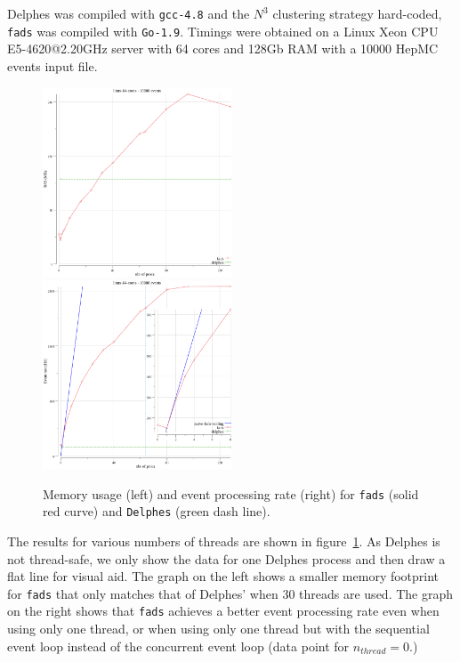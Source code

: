 \documentclass[a4paper]{jpconf}
\begin{document}
Delphes was compiled with \texttt{gcc-4.8} and the $N^3$ clustering strategy hard-coded, \texttt{fads} was compiled with \texttt{Go-1.9}.
Timings were obtained on a Linux Xeon CPU E5-4620@2.20GHz server with 64 cores and 128Gb RAM with a 10000 HepMC events input file.
\begin{figure}[h]
 \includegraphics[width=0.5\textwidth]{figs/linux-64-cores-rss.png}
 \includegraphics[width=0.5\textwidth]{figs/linux-64-cores-hz.png}
	\caption{\label{fig-fads-perfs}Memory usage (left) and event processing rate (right) for \texttt{fads} (solid red curve) and \texttt{Delphes} (green dash line).}
\end{figure}

The results for various numbers of threads are shown in figure~\ref{fig-fads-perfs}.
As Delphes is not thread-safe, we only show the data for one Delphes process and then draw a flat line for visual aid.
The graph on the left shows a smaller memory footprint for \texttt{fads} that only matches that of Delphes' when 30 threads are used.
The graph on the right shows that \texttt{fads} achieves a better event processing rate even when using only one thread, or when using only one thread but with the sequential event loop instead of the concurrent event loop (data point for $n_{thread}=0$.)
\end{document}

